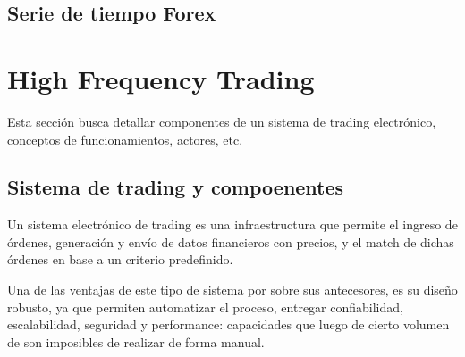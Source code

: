 
\subsection{Serie de tiempo Forex}

\section{High Frequency Trading}

Esta sección busca detallar componentes de un sistema de trading electrónico, 
conceptos de funcionamientos, actores, etc.

\subsection{Sistema de trading y compoenentes}
Un sistema electrónico de trading es una infraestructura que permite el ingreso
de órdenes, generación y envío de datos financieros con precios, y el match de
dichas órdenes en base a un criterio predefinido.

Una de las ventajas de este tipo de sistema por sobre sus antecesores, es su
diseño robusto, ya que permiten automatizar el proceso, entregar confiabilidad,
escalabilidad, seguridad y performance: capacidades que luego de cierto volumen
de son imposibles de realizar de forma manual.


